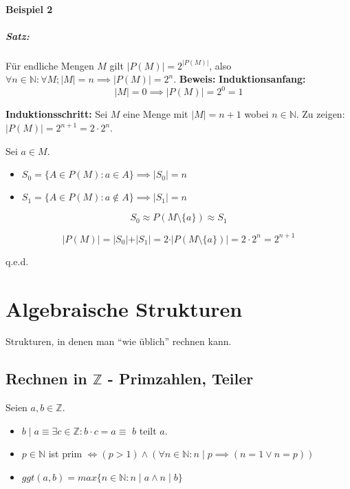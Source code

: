 \documentclass[12pt]{scrreprt}
\newcommand{\theorem}[1]{\paragraph{Satz:} #1\newline}
\newenvironment{proof}
    {\textbf{Beweis:}\newline\indent}
    {\begin{flushright}q.e.d.\end{flushright}}
\begin{document}
                \subsubsection{Beispiel 2}
                    \theorem{Für endliche Mengen $ M $ gilt $ \vert P(M) \vert = 2 ^ { \vert P(M) \vert } $, also $ \forall n \in \mathbb{N} : \forall M ; \vert M \vert = n \implies \vert P(M) \vert = 2 ^ n $.}
                        \begin{proof}
                            \textbf{Induktionsanfang:} \[ \vert M \vert = 0 \implies \vert P(M) \vert = 2 ^ 0 = 1 \]

                            \textbf{Induktionsschritt:} Sei $ M $ eine Menge mit $ \vert M \vert = n + 1 $ wobei $ n \in \mathbb{N} $. Zu zeigen: $ \vert P(M) \vert = 2 ^ { n + 1 } = 2 \cdot 2 ^ n $.

                            Sei $ a \in M $.

                            \begin{itemize}
                                \item $ S _ 0 = \{ A \in P(M) : a \in A \} \implies \vert S _ 0 \vert = n $
                                \item $ S _ 1 = \{ A \in P(M) : a \not\in A \} \implies \vert S _ 1 \vert = n $
                            \end{itemize}

                            \[ S _ 0 \approx P(M \setminus \{ a \}) \approx S _1 \]

                            \[ \vert P(M) \vert = \vert S _ 0 \vert + \vert S _ 1 \vert = 2 \cdot \vert P(M \setminus \{ a \}) \vert = 2 \cdot 2 ^ n = 2 ^ { n + 1 } \]
                        \end{proof}


    \chapter{Algebraische Strukturen}
        Strukturen, in denen man "`wie üblich"' rechnen kann.

        \section{Rechnen in $ \mathbb{Z} $ - Primzahlen, Teiler}
            Seien $ a, b \in \mathbb{Z} $.

            \begin{itemize}
                \item $ b \mid a \equiv \exists c \in \mathbb{Z} : b \cdot c = a \equiv $ $ b $ teilt $ a $.
                \item $ p \in \mathbb{N} $ ist prim $ \iff (p > 1) \land (\forall n \in \mathbb{N} : n \mid p \implies (n = 1 \lor n = p)) $
                \item $ ggt(a, b) = max \{ n \in \mathbb{N} : n \mid a \land n \mid b \} $
            \end{itemize}
\end{document}
